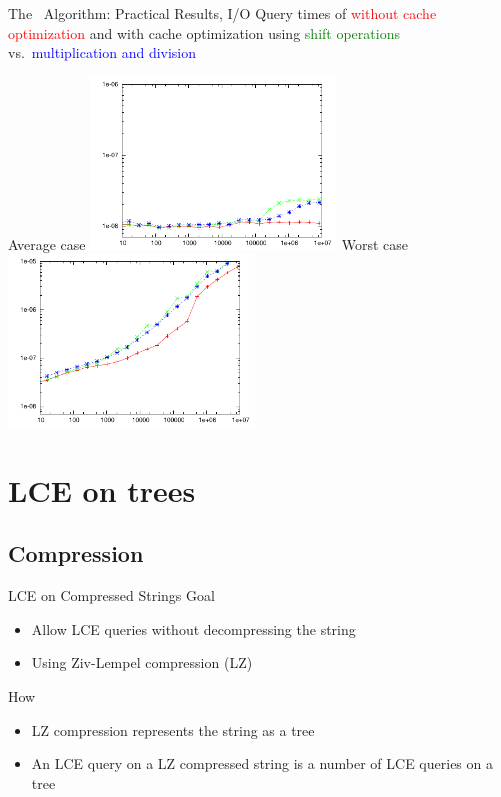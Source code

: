 \documentclass{beamer}
\begin{document}
\begin{frame}{The \fprintk\ Algorithm: Practical Results, I/O}
    Query times of \fprint[3]
    \textcolor{red}{without cache optimization}
    and with cache optimization using
    \textcolor{green}{shift operations} vs.\
    \textcolor{blue}{multiplication and division}
    \begin{multicols}{2}{
        \begin{center}
            Average case
            \includegraphics[width=0.49\textwidth,type=pdf,ext=.pdf,read=.pdf]{../src/results/length-slides-cache-fp3-rand10.plt}
            \newpage
            Worst case
            \includegraphics[width=0.49\textwidth,type=pdf,ext=.pdf,read=.pdf]{../src/results/length-slides-cache-fp3-alla.plt}
        \end{center}
    }
    \end{multicols}
\end{frame}

\section{LCE on trees}
\subsection{Compression}
\begin{frame}{LCE on Compressed Strings}
    Goal
    \begin{itemize}
        \item Allow LCE queries without decompressing the string
        \item Using Ziv-Lempel compression (LZ)
    \end{itemize}
    How
    \begin{itemize}
        \item LZ compression represents the string as a tree
        \item An LCE query on a LZ compressed string is a number of LCE queries on a tree
    \end{itemize}
\end{frame}
\end{document}
